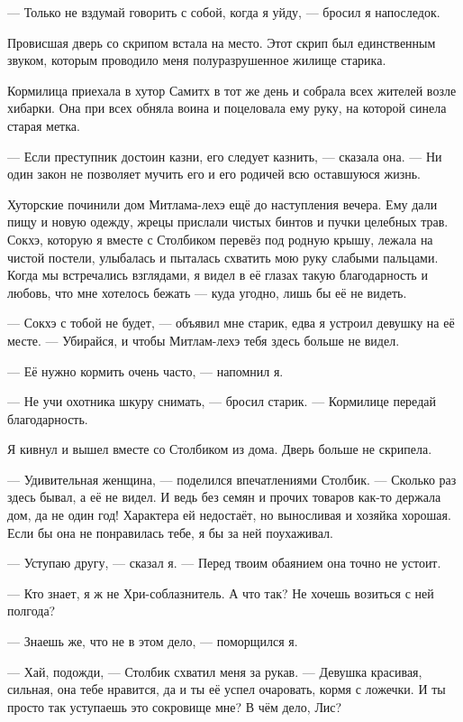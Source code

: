 --- Только не вздумай говорить с собой, когда я уйду, --- бросил я напоследок.

Провисшая дверь со скрипом встала на место.
Этот скрип был единственным звуком, которым проводило меня полуразрушенное жилище старика.

\asterism

Кормилица приехала в хутор Самитх в тот же день и собрала всех жителей возле хибарки.
Она при всех обняла воина и поцеловала ему руку, на которой синела старая метка.

--- Если преступник достоин казни, его следует казнить, --- сказала она.
--- Ни один закон не позволяет мучить его и его родичей всю оставшуюся жизнь.

Хуторские починили дом Митлама-лехэ ещё до наступления вечера.
Ему дали пищу и новую одежду, жрецы прислали чистых бинтов и пучки целебных трав.
Сокхэ, которую я вместе с Столбиком перевёз под родную крышу, лежала на чистой постели, улыбалась и пыталась схватить мою руку слабыми пальцами.
Когда мы встречались взглядами, я видел в её глазах такую благодарность и любовь, что мне хотелось бежать --- куда угодно, лишь бы её не видеть.

--- Сокхэ с тобой не будет, --- объявил мне старик, едва я устроил девушку на её месте.
--- Убирайся, и чтобы Митлам-лехэ тебя здесь больше не видел.

--- Её нужно кормить очень часто, --- напомнил я.

--- Не учи охотника шкуру снимать, --- бросил старик.
--- Кормилице передай благодарность.

Я кивнул и вышел вместе со Столбиком из дома.
Дверь больше не скрипела.

--- Удивительная женщина, --- поделился впечатлениями Столбик.
--- Сколько раз здесь бывал, а её не видел.
И ведь без семян и прочих товаров как-то держала дом, да не один год!
Характера ей недостаёт, но выносливая и хозяйка хорошая.
Если бы она не понравилась тебе, я бы за ней поухаживал.

--- Уступаю другу, --- сказал я.
--- Перед твоим обаянием она точно не устоит.

--- Кто знает, я ж не Хри-соблазнитель.
А что так?
Не хочешь возиться с ней полгода?

--- Знаешь же, что не в этом дело, --- поморщился я.

--- Хай, подожди, --- Столбик схватил меня за рукав.
--- Девушка красивая, сильная, она тебе нравится, да и ты её успел очаровать, кормя с ложечки.
И ты просто так уступаешь это сокровище мне?
В чём дело, Лис?


